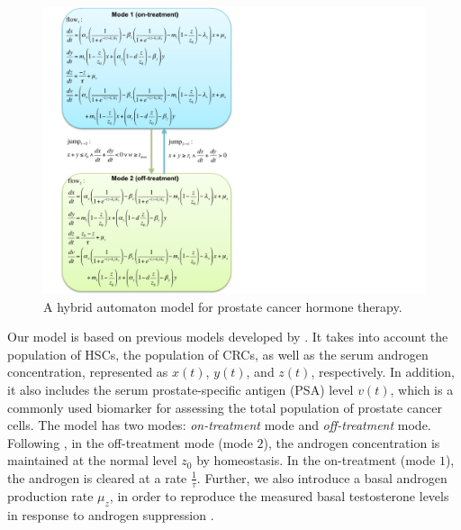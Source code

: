 \begin{figure}[htb]
\centering
\includegraphics[scale=0.6]{fig-prostate}
\caption{A hybrid automaton model for prostate cancer hormone therapy.}
\label{pmodel}
\end{figure}

Our model is based on previous models developed by \cite{jackson04a,jackson04b,ideta08}. It takes into account the population of HSCs, the population of CRCs, as well as the serum androgen concentration, represented as $x(t)$, $y(t)$, and $z(t)$, respectively. In addition, it also includes the serum prostate-specific antigen (PSA) level $v(t)$, which is a commonly used biomarker for assessing the total population of prostate cancer cells. The model has two modes: \textit{on-treatment} mode and \textit{off-treatment} mode. Following \cite{ideta08}, in the off-treatment mode (mode $2$), the androgen concentration is maintained at the normal level $z_0$ by homeostasis. In the on-treatment (mode $1$), the androgen is cleared at a rate $\frac{1}{\tau}$. Further, we also introduce a basal androgen production rate $\mu_z$, in order to reproduce the measured basal testosterone levels in response to androgen suppression \cite{bruchovsky06, bruchovsky07}. 

